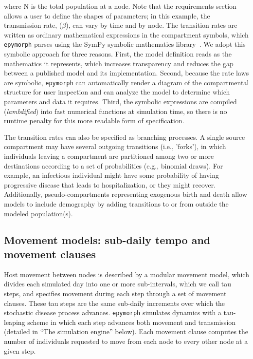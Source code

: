 where N is the total population at a node. 
Note that the requirements section allows a user to define the shapes of parameters; in this example, the transmission rate, ($\beta$), can vary by time and by node. 
The transition rates are written as ordinary mathematical expressions in the compartment symbols, which \texttt{epymorph} parses using the SymPy symbolic mathematics library~\citep{meurer_sympy_2017}. 
We adopt this symbolic approach for three reasons. 
First, the model definition reads as the mathematics it represents, which increases transparency and reduces the gap between a published model and its implementation. 
Second, because the rate laws are symbolic, \texttt{epymorph} can automatically render a diagram of the compartmental structure for user inspection and can analyze the model to determine which parameters and data it requires. 
Third, the symbolic expressions are compiled (\textit{lambdified}) into fast numerical functions at simulation time, so there is no runtime penalty for this more readable form of specification.

The transition rates can also be specified as branching processes. 
A single source compartment may have several outgoing transitions (i.e., 'forks'), in which individuals leaving a compartment are partitioned among two or more destinations according to a set of probabilities (e.g., binomial draws). 
For example, an infectious individual might have some probability of having progressive disease that leads to hospitalization, or they might recover. 
Additionally, pseudo-compartments representing exogenous birth and death allow models to include demography by adding transitions to or from outside the modeled population(s).

\subsection{Movement models: sub-daily tempo and movement clauses}

Host movement between nodes is described by a modular movement model, which divides each simulated day into one or more sub-intervals, which we call tau steps, and specifies movement during each step through a set of movement clauses. 
These tau steps are the same sub-daily increments over which the stochastic disease process advances.
\texttt{epymorph} simulates dynamics with a tau-leaping scheme in which each step advances both movement and transmission (detailed in ``The simulation engine'' below). 
Each movement clause computes the number of individuals requested to move from each node to every other node at a given step.

